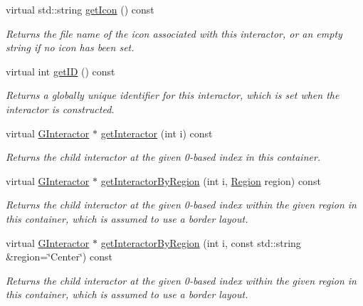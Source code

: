 \begin{DoxyCompactItemize}
virtual std\+::string \mbox{\hyperlink{classsgl_1_1GInteractor_aaed62a73004939a64da6f0eb9eb64d73}{get\+Icon}} () const
\begin{DoxyCompactList}\small\item\em Returns the file name of the icon associated with this interactor, or an empty string if no icon has been set. \end{DoxyCompactList}\item 
virtual int \mbox{\hyperlink{classsgl_1_1GInteractor_a9c9659a6c6ba66b4107ba59c95a24241}{get\+ID}} () const
\begin{DoxyCompactList}\small\item\em Returns a globally unique identifier for this interactor, which is set when the interactor is constructed. \end{DoxyCompactList}\item 
virtual \mbox{\hyperlink{classsgl_1_1GInteractor}{G\+Interactor}} $\ast$ \mbox{\hyperlink{classsgl_1_1GContainer_ac59d7bae6154f6f8791c7f1fd856b157}{get\+Interactor}} (int i) const
\begin{DoxyCompactList}\small\item\em Returns the child interactor at the given 0-\/based index in this container. \end{DoxyCompactList}\item 
virtual \mbox{\hyperlink{classsgl_1_1GInteractor}{G\+Interactor}} $\ast$ \mbox{\hyperlink{classsgl_1_1GContainer_ad31230cd6d220466fbd18fd21d133f67}{get\+Interactor\+By\+Region}} (int i, \mbox{\hyperlink{classsgl_1_1GContainer_a81a01a86de31071a92e6cce0bab9bc4b}{Region}} region) const
\begin{DoxyCompactList}\small\item\em Returns the child interactor at the given 0-\/based index within the given region in this container, which is assumed to use a border layout. \end{DoxyCompactList}\item 
virtual \mbox{\hyperlink{classsgl_1_1GInteractor}{G\+Interactor}} $\ast$ \mbox{\hyperlink{classsgl_1_1GContainer_a576bbbb845c9bcf139fca956e3a4c757}{get\+Interactor\+By\+Region}} (int i, const std\+::string \&region=\char`\"{}Center\char`\"{}) const
\begin{DoxyCompactList}\small\item\em Returns the child interactor at the given 0-\/based index within the given region in this container, which is assumed to use a border layout. \end{DoxyCompactList}\item 

\end{DoxyCompactItemize}
